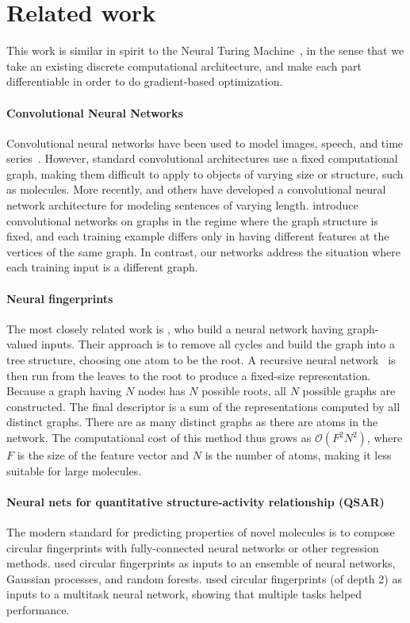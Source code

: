 \documentclass{article}
\begin{document}
\section{Related work}
This work is similar in spirit to the Neural Turing Machine~\citep{graves2014neural}, in the sense that we take an existing discrete computational architecture, and make each part differentiable in order to do gradient-based optimization.

\paragraph{Convolutional Neural Networks}
Convolutional neural networks have been used to model images, speech, and time series~\citep{lecun1995convolutional}.
However, standard convolutional architectures use a fixed computational graph, making them difficult to apply to objects of varying size or structure, such as molecules.
More recently, \cite{KalchbrennerACL2014} and others have developed a convolutional neural network architecture for modeling sentences of varying length.
\cite{bruna2013spectral} introduce convolutional networks on graphs in the regime where the graph structure is fixed, and each training example differs only in having different features at the vertices of the same graph.
In contrast, our networks address the situation where each training input is a different graph.

\paragraph{Neural fingerprints}
The most closely related work is \citet{lusci2013deep}, who build a neural network having graph-valued inputs.
Their approach is to remove all cycles and build the graph into a tree structure, choosing one atom to be the root.
A recursive neural network~\citep{socher2011dynamic, socher2011semi} is then run from the leaves to the root to produce a fixed-size representation.
Because a graph having $N$ nodes has $N$ possible roots, all $N$ possible graphs are constructed.
The final descriptor is a sum of the representations computed by all distinct graphs.
There are as many distinct graphs as there are atoms in the network.
The computational cost of this method thus grows as $\mathcal{O}(F^2N^2)$, where $F$ is the size of the feature vector and $N$ is the number of atoms, making it less suitable for large molecules.

\paragraph{Neural nets for quantitative structure-activity relationship (QSAR)}
The modern standard for predicting properties of novel molecules is to compose circular fingerprints with fully-connected neural networks or other regression methods.
\cite{dahl2014multi} used circular fingerprints as inputs to an ensemble of neural networks, Gaussian processes, and random forests.
\cite{ramsundar2015massively} used circular fingerprints (of depth 2) as inputs to a multitask neural network, showing that multiple tasks helped performance.
\end{document}
